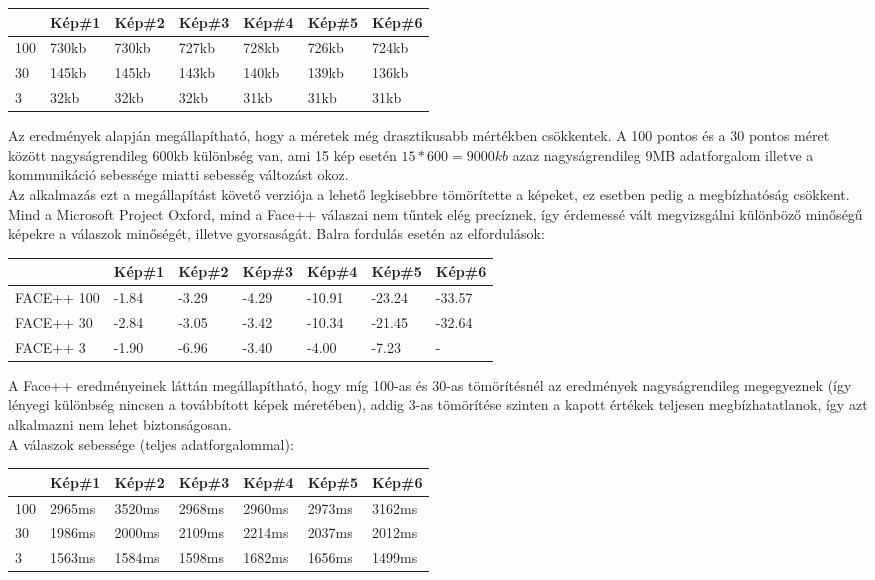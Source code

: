 \begin{center}
	\begin{tabular}{|p{1cm}|p{} |p{} | p{}|p{}|p{}|p{}|}
   	\hline
	 & Kép\#1 & Kép\#2& Kép\#3&Kép\#4 &Kép\#5 &Kép\#6\\ \hline
	100 & 730kb & 730kb & 727kb & 728kb & 726kb & 724kb \\ \hline
	30 & 145kb & 145kb & 143kb & 140kb & 139kb & 136kb \\ \hline
	3 & 32kb & 32kb & 32kb & 31kb & 31kb & 31kb\\ \hline
	\end{tabular}
\end{center}

Az eredmények alapján megállapítható, hogy a méretek még drasztikusabb mértékben csökkentek. A 100 pontos és a 30 pontos méret között nagyságrendileg 600kb különbség van, ami 15 kép esetén $15*600 = 9000kb$ azaz nagyságrendileg 9MB adatforgalom illetve a kommunikáció sebessége miatti sebesség változást okoz.
\\Az alkalmazás ezt a megállapítást követő verziója a lehető legkisebbre tömörítette a képeket, ez esetben pedig a megbízhatóság csökkent. Mind a Microsoft Project Oxford, mind a Face++ válaszai nem tűntek elég precíznek, így érdemessé vált megvizsgálni különböző minőségű képekre a válaszok minőségét, illetve gyorsaságát.
Balra fordulás esetén az elfordulások:
\begin{center}
	\begin{tabular}{|p{2cm}|p{} |p{} | p{}|p{}|p{}|p{}|}
   	\hline
	 & Kép\#1 & Kép\#2& Kép\#3&Kép\#4 &Kép\#5 &Kép\#6\\ \hline
	FACE++ 100 & -1.84 & -3.29 & -4.29 & -10.91 & -23.24 & -33.57 \\ \hline
	FACE++ 30 & -2.84 & -3.05 & -3.42 & -10.34 & -21.45 & -32.64 \\ \hline
	FACE++ 3 & -1.90 & -6.96 & -3.40 & -4.00 & -7.23 & -\\ \hline
	\end{tabular}
\end{center}

A Face++ eredményeinek láttán megállapítható, hogy míg 100-as és 30-as tömörítésnél az eredmények nagyságrendileg megegyeznek (így lényegi különbség nincsen a továbbított képek méretében), addig 3-as tömörítése szinten a kapott értékek teljesen megbízhatatlanok, így azt alkalmazni nem lehet biztonságosan. 
\\A válaszok sebessége (teljes adatforgalommal): 
\begin{center}
	\begin{tabular}{|p{1cm}|p{} |p{} | p{}|p{}|p{}|p{}|}
   	\hline
	 & Kép\#1 & Kép\#2& Kép\#3&Kép\#4 &Kép\#5 &Kép\#6\\ \hline
	100 & 2965ms & 3520ms & 2968ms & 2960ms & 2973ms & 3162ms \\ \hline
	30 & 1986ms & 2000ms & 2109ms & 2214ms & 2037ms & 2012ms \\ \hline
	3 & 1563ms & 1584ms & 1598ms & 1682ms & 1656ms & 1499ms\\ \hline
	\end{tabular}
\end{center}


